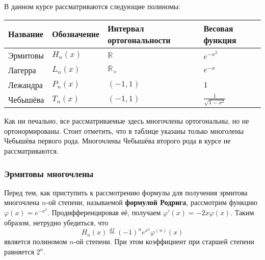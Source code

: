\documentclass[12pt]{article}
\begin{document}
	В данном курсе рассматриваются следующие полиномы:

	\begin{table}[!th]
		\begin{tabular}{|l|l|l|l|}
			\hline
			Название & Обозначение & Интервал ортогональности & Весовая функция \\
			\hline
			Эрмитовы & $H_n(x)$ & $\mathbb{R}$ & $e^{-x^2}$ \\
			Лагерра  & $L_n(x)$ & $\mathbb{R}_+$ & $e^{-x}$ \\
			Лежандра & $P_n(x)$ & $(-1, 1)$ & $1$ \\
			Чебышёва & $T_n(x)$ & $(-1, 1)$ & $\frac{1}{\sqrt{1-x^2}}$ \\
			\hline
		\end{tabular}
	\end{table}
	
	Как ни печально, все рассматриваемые здесь многочлены ортогональны, но не ортонормированы.
	Стоит отметить, что в таблице указаны только многолены Чебышёва первого рода. Многочлены Чебышёва второго рода в курсе 
	не рассматриваются.
	
	\subsubsection{Эрмитовы многочлены}
	
	Перед тем, как приступить к рассмотрению формулы для получения эрмитова многочлена $n$-ой степени, называемой 
	\textbf{формулой Родрига}, рассмотрим функцию $\varphi(x) = e^{-x^2}$. Продифференцировав её, получаем 
	$\varphi'(x) = -2x \varphi(x)$. Таким образом, нетрудно убедиться, что
	$$H_n(x) \overset{df}{=} (-1)^n e^{x^2} \varphi^{(n)} (x)$$
	является полиномом $n$-ой степени. При этом коэффициент при старшей степени равняется $2^n$.
	
\end{document}
